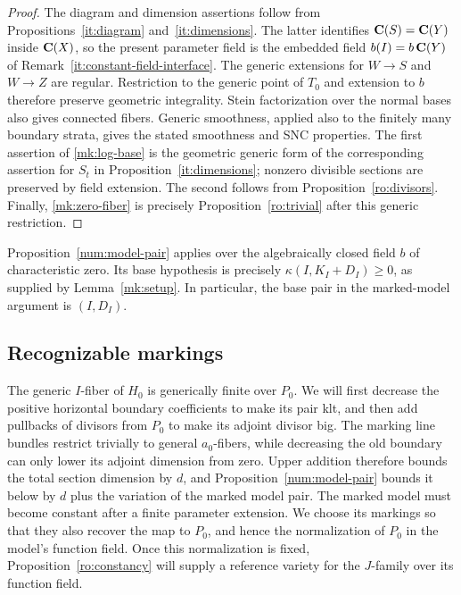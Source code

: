 \begin{proof}
The diagram and dimension assertions follow from
Propositions~\ref{it:diagram} and~\ref{it:dimensions}. The latter
identifies $\mathbf C(S)=\mathbf C(Y)$ inside $\mathbf C(X)$, so the present parameter
field is the embedded field $b(I)=b\,\mathbf C(Y)$ of
Remark~\ref{it:constant-field-interface}. The generic extensions for
$W\to S$ and $W\to Z$ are regular. Restriction to the generic point
of $T_0$ and extension to $b$ therefore preserve geometric integrality. Stein
factorization over the normal bases also gives connected fibers.  Generic
smoothness, applied also to the finitely many boundary strata, gives the
stated smoothness and SNC properties.  The first assertion of
\eqref{mk:log-base} is the geometric generic form of the corresponding
assertion for $S_t$ in Proposition~\ref{it:dimensions}; nonzero divisible
sections are preserved by field extension.  The second follows from
Proposition~\ref{ro:divisors}.  Finally, \eqref{mk:zero-fiber} is precisely
Proposition~\ref{ro:trivial} after this generic restriction.
\end{proof}

Proposition~\ref{num:model-pair} applies over the algebraically closed
field $b$ of characteristic zero. Its base hypothesis is precisely
$\kappa(I,K_I+D_I)\geq0$, as supplied by Lemma~\ref{mk:setup}.
In particular, the base pair in the marked-model argument is $(I,D_I)$.

\subsection{Recognizable markings}

The generic $I$-fiber of $H_0$ is generically finite over $P_0$.
We will first decrease the positive horizontal boundary coefficients
to make its pair klt, and then add pullbacks of divisors from $P_0$
to make its adjoint divisor big. The marking line bundles restrict
trivially to general $a_0$-fibers, while decreasing the old boundary
can only lower its adjoint dimension from zero. Upper addition
therefore bounds the total section dimension by $d$, and
Proposition~\ref{num:model-pair} bounds it below by $d$ plus the
variation of the marked model pair. The marked model must become
constant after a finite parameter extension. We choose its markings
so that they also recover the map to $P_0$, and hence the normalization
of $P_0$ in the model's function field. Once this normalization is fixed,
Proposition~\ref{ro:constancy} will supply a reference variety for
the $J$-family over its function field.

